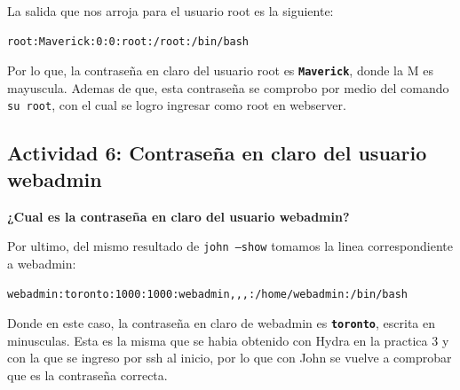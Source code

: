 \documentclass[letterpaper,11pt]{article}
\begin{document}
La salida que nos arroja para el usuario root es la siguiente:

\begin{lstlisting}[style=output]
root:Maverick:0:0:root:/root:/bin/bash
\end{lstlisting}

Por lo que, la contraseña en claro del usuario root es
\textbf{\texttt{Maverick}}, donde la M es mayuscula. Ademas de
que, esta contraseña se comprobo por medio del comando
\texttt{su root}, con el cual se logro ingresar como root en
webserver.

\subsection{Actividad 6: Contraseña en claro del usuario webadmin}

\textbf{¿Cual es la contraseña en claro del usuario webadmin?}

Por ultimo, del mismo resultado de \texttt{john --show} tomamos
la linea correspondiente a webadmin:

\begin{lstlisting}[style=output]
webadmin:toronto:1000:1000:webadmin,,,:/home/webadmin:/bin/bash
\end{lstlisting}

Donde en este caso, la contraseña en claro de webadmin es
\textbf{\texttt{toronto}}, escrita en minusculas. Esta es la
misma que se habia obtenido con Hydra en la practica 3 y con la
que se ingreso por ssh al inicio, por lo que con John se vuelve
a comprobar que es la contraseña correcta.

\newpage
\nocite{*}
\printbibliography[heading=bibintoc, title={Referencias}]
\end{document}
